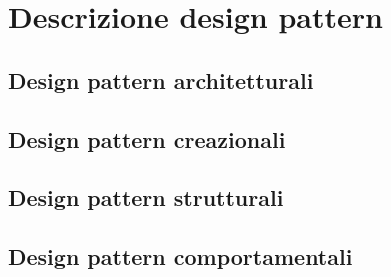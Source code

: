\documentclass[../SpecificaTecnica.tex]{subfiles}
\begin{document}
\section{Descrizione design pattern}
	\subsection{Design pattern architetturali}
	\subsection{Design pattern creazionali}
	\subsection{Design pattern strutturali}
	\subsection{Design pattern comportamentali}
\end{document}
